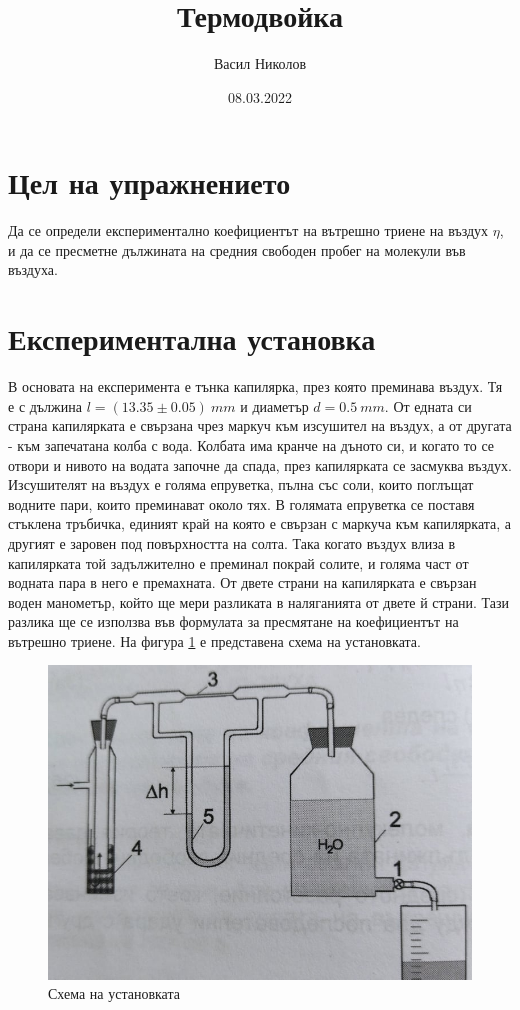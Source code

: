 \documentclass[%
 reprint,
 amsmath,amssymb,
 aps,
]{revtex4-2}
\begin{document}
\setlength{\abovedisplayskip}{3pt}
\setlength{\belowdisplayskip}{3pt}    

\title{Термодвойка}
\author{Васил Николов}
\date{08.03.2022}
\maketitle

\section{Цел на упражнението}

Да се определи експериментално коефициентът на вътрешно триене на въздух $\eta$, и да се пресметне дължината на средния свободен пробег на молекули във въздуха. 

\section{Експериментална установка}

В основата на експеримента е тънка капилярка, през която преминава въздух. Тя е с дължина $l=(13.35 \pm 0.05) \ \si{mm}$ и диаметър $d = 0.5 \ \si{mm}$. От едната си страна капилярката е свързана чрез маркуч към изсушител на въздух, а от другата - към запечатана колба с вода. Колбата има кранче на дъното си, и когато то се отвори и нивото на водата започне да спада, през капилярката се засмуква въздух. Изсушителят на въздух е голяма епруветка, пълна със соли, които поглъщат водните пари, които преминават около тях. В голямата епруветка се поставя стъклена тръбичка, единият край на която е свързан с маркуча към капилярката, а другият е заровен под повърхността на солта. Така когато въздух влиза в капилярката той задължително е преминал покрай солите, и голяма част от водната пара в него е премахната. От двете страни на капилярката е свързан воден манометър, който ще мери разликата в наляганията от двете й страни. Тази разлика ще се използва във формулата за пресмятане на коефициентът на вътрешно триене. На фигура \ref{fig:1} е представена схема на установката. 

\begin{figure}[H] 
    \centering
    \includegraphics[width=0.9\columnwidth, keepaspectratio=true]{scheme_1.jpg}
    \caption{Схема на установката}\label{fig:1} 
\end{figure}
\end{document}
